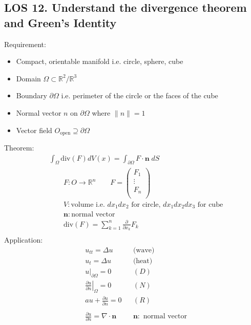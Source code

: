 \documentclass[12pt, a4paper]{article}
\begin{document}
\subsection*{LOS 12. Understand the divergence theorem and Green's Identity}
Requirement:
\begin{itemize}
    \item Compact, orientable manifold i.e. circle, sphere, cube
    \item Domain $\Omega \subset \mathbb{R}^2/\mathbb{R}^3$
    \item Boundary $\partial\Omega$ i.e. perimeter of the circle or the faces of the cube
    \item Normal vector $n$ on $\partial\Omega$ where $\|n\|=1$
    \item Vector field $O_\text{open} \supseteq \partial\Omega$\\
\end{itemize}
Theorem:
\begin{align*}
    &\int_\Omega \text{div}(F)dV(x) = \int_{\partial\Omega} F\cdot\mathbf{n}\;dS\\
    &\qquad F: O \rightarrow \mathbb{R}^n \qquad F = \left(\begin{array}{c}
        F_1\\
        \vdots\\
        F_n\\
    \end{array}\right)\\
    &\qquad V: \text{volume i.e. $dx_1 dx_2$ for circle, $dx_1dx_2dx_3$ for cube}\\
    &\qquad \mathbf{n} : \text{normal vector}\\
    &\qquad \text{div}(F) = \sum_{k=1}^n\frac{\partial}{\partial x_k}F_k\\
\end{align*}
Application:
\begin{align*}
    &u_{tt} = \Delta u &&\text{(wave)}\\
    &u_t = \Delta u &&\text{(heat)}\\
    &\left.u\right\rvert_{\partial\Omega} = 0&&(D)\\
    &\left.\frac{\partial u}{\partial n}\right\rvert_{\Omega} = 0&&(N)\\
    &au + \frac{\partial u}{\partial n} = 0&&(R)\\\\
    &\frac{\partial u}{\partial n} = \nabla \cdot \mathbf{n}&&\mathbf{n}:\text{ normal vector}\\
\end{align*}
\end{document}
